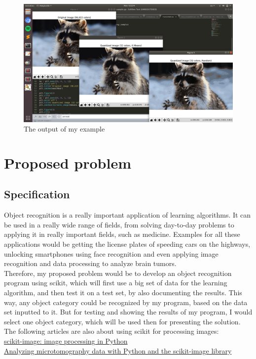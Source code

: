 \documentclass[a4paper,10pt]{article}
\newcommand\tab[1][0.5cm]{\hspace*{#1}}
\begin{document}
\begin{figure}[h]
 \centering
  \includegraphics[width=1\textwidth]{raccoon.png}
  \caption{The output of my example}
 \end{figure}
 
 \section{Proposed problem}
  \subsection{Specification} 
  \tab Object recognition is a really important application of learning algorithms. It can be used in a really wide range of fields, from solving day-to-day problems to applying it in really important fields, such as medicine. Examples for all these applications would be getting the license plates of speeding cars on the highways, unlocking smartphones using face recognition and even applying image recognition and data processing to analyze brain tumors. \\
  \tab Therefore, my proposed problem would be to develop an object recognition program using {\selectfont scikit}, which will first use a big set of data for the learning algorithm, and then test it on a test set, by also documenting the results. This way, any object category could be recognized by my program, based on the data set inputted to it. But for testing and showing the results of my program, I would select one object category, which will be used then for presenting the solution.\\
  \tab The following articles are also about using {\selectfont scikit} for processing images:\\
  \tab \href{https://peerj.com/articles/453.pdf}{scikit-image: image processing in Python}\\
  \tab \href{https://link.springer.com/content/pdf/10.1186\%2Fs40679-016-0031-0.pdf}{Analyzing microtomography data with Python and the scikit-image library}\\
  
\end{document}
